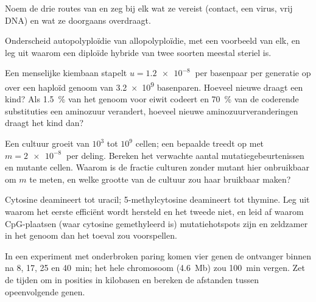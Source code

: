 \begin{exercise}[$\star$]\label{exo:b2:genome-diversification:3}
Noem de drie routes van  en zeg bij elk wat ze
vereist (contact, een virus, vrij DNA) en wat ze doorgaans overdraagt.
\end{exercise}

\begin{exercise}[$\star$]\label{exo:b2:genome-diversification:4}
Onderscheid autopolyploïdie van allopolyploïdie, met een voorbeeld van
elk, en leg uit waarom een diploïde hybride van twee soorten meestal
steriel is.
\end{exercise}

\begin{exercise}[$\star\star$]\label{exo:b2:genome-diversification:5}
Een menselijke kiembaan stapelt $u = \qty{1.2e-8}{}$  per
basenpaar per generatie op over een haploïd genoom van \qty{3.2e9}{}
basenparen. Hoeveel nieuwe  draagt een kind? Als \qty{1.5}{\%}
van het genoom voor eiwit codeert en \qty{70}{\%} van de coderende
substituties een aminozuur verandert, hoeveel nieuwe aminozuurveranderingen
draagt het kind dan?
\end{exercise}

\begin{exercise}[$\star\star$]\label{exo:b2:genome-diversification:6}
Een cultuur groeit van $10^{3}$ tot $10^{9}$ cellen; een bepaalde 
treedt op met $m = \qty{2e-8}{}$ per deling. Bereken het verwachte aantal
mutatiegebeurtenissen en mutante cellen. Waarom is de fractie culturen
zonder mutant hier onbruikbaar om $m$ te meten, en welke grootte van de
cultuur zou haar bruikbaar maken?
\end{exercise}

\begin{exercise}[$\star\star$]\label{exo:b2:genome-diversification:7}
Cytosine deamineert tot uracil; 5-methylcytosine deamineert tot thymine.
Leg uit waarom het eerste efficiënt wordt hersteld en het tweede niet,
en leid af waarom CpG-plaatsen (waar cytosine gemethyleerd is)
mutatiehotspots zijn en zeldzamer in het genoom dan het toeval zou
voorspellen.
\end{exercise}

\begin{exercise}[$\star\star$]\label{exo:b2:genome-diversification:8}
In een experiment met onderbroken paring komen vier genen de ontvanger
binnen na 8, 17, 25 en \qty{40}{min}; het hele chromosoom (\qty{4.6}{Mb})
zou \qty{100}{min} vergen. Zet de tijden om in posities in kilobasen en
bereken de afstanden tussen opeenvolgende genen.
\end{exercise}

